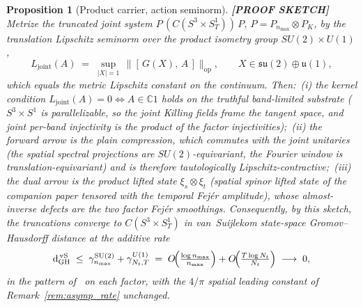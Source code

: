\documentclass[11pt,a4paper]{article}
\theoremstyle{plain}
\newtheorem{proposition}[theorem]{Proposition}
\theoremstyle{definition}
\newcommand{\nmax}{n_{\max}}
\newcommand{\Nt}{N_{t}}
\newcommand{\sthree}{S^{3}}
\newcommand{\Sone}{S^{1}}
\newcommand{\C}{\mathbb{C}}
\newcommand{\SU}{\mathrm{SU}}
\newcommand{\Uone}{U(1)}
\newcommand{\gammaSU}{\gamma^{\SU(2)}}
\newcommand{\gammaU}{\gamma^{\Uone}}
\begin{document}
\begin{proposition}[Product carrier, action seminorm]
\label{prop:product_action_seminorm}
\textbf{[PROOF SKETCH]} Metrize the truncated joint system $P\,(C(\sthree \times \Sone_{T}))\,P$,
$P = P_{\nmax} \otimes P_{K}$, by the translation Lipschitz seminorm
over the product isometry group $SU(2) \times \Uone$,
\begin{equation*}
  L_{\mathrm{joint}}(A) \;=\; \sup_{|X| = 1}\,
  \bigl\| [\,G(X),\, A\,] \bigr\|_{\mathrm{op}},
  \qquad X \in \mathfrak{su}(2) \oplus \mathfrak{u}(1),
\end{equation*}
which equals the metric Lipschitz constant on the continuum. Then:\
(i) the kernel condition $L_{\mathrm{joint}}(A) = 0 \Leftrightarrow A
\in \C 1$ holds on the truthful band-limited substrate ($\sthree
\times \Sone$ is parallelizable, so the joint Killing fields frame the
tangent space, and joint per-band injectivity is the product of the
factor injectivities);\
(ii) the forward arrow is the plain compression, which commutes with
the joint unitaries (the spatial spectral projections are
$SU(2)$-equivariant, the Fourier window is translation-equivariant)
and is therefore tautologically Lipschitz-contractive;\
(iii) the dual arrow is the product lifted state $\xi_{s} \otimes
\xi_{t}$ (spatial spinor lifted state of the companion paper tensored
with the temporal Fej\'er amplitude), whose almost-inverse defects are
the two factor Fej\'er smoothings. Consequently, by this sketch, the
truncations converge to $C(\sthree \times \Sone_{T})$ in van~Suijlekom state-space
Gromov--Hausdorff distance at the additive rate
\begin{equation}\label{eq:product_rate}
  \mathrm{d}_{\mathrm{GH}}^{\,\mathrm{vS}} \;\le\;
  \gammaSU_{\nmax} + \gammaU_{\Nt, T}
  \;=\; O\!\Bigl(\tfrac{\log\nmax}{\nmax}\Bigr)
      + O\!\Bigl(\tfrac{T \log \Nt}{\Nt}\Bigr) \;\longrightarrow\; 0,
\end{equation}
in the pattern of~\cite{gaudillot_vs2023} on each factor, with the
$4/\pi$ spatial leading constant of Remark~\ref{rem:asymp_rate}
unchanged.
\end{proposition}
\end{document}
